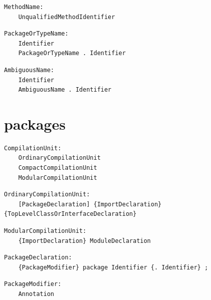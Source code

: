 \noindent\textbf{\texttt{}}\par
\begin{lstlisting}
MethodName:
    UnqualifiedMethodIdentifier
\end{lstlisting}

\noindent\textbf{\texttt{}}\par
\begin{lstlisting}
PackageOrTypeName:
    Identifier
    PackageOrTypeName . Identifier
\end{lstlisting}

\noindent\textbf{\texttt{}}\par
\begin{lstlisting}
AmbiguousName:
    Identifier
    AmbiguousName . Identifier
\end{lstlisting}

\section{packages}

\noindent\textbf{\texttt{}}\par
\begin{lstlisting}
CompilationUnit:
    OrdinaryCompilationUnit
    CompactCompilationUnit
    ModularCompilationUnit
\end{lstlisting}

\noindent\textbf{\texttt{}}\par
\begin{lstlisting}
OrdinaryCompilationUnit:
    [PackageDeclaration] {ImportDeclaration} {TopLevelClassOrInterfaceDeclaration}
\end{lstlisting}

\noindent\textbf{\texttt{}}\par
\begin{lstlisting}
ModularCompilationUnit:
    {ImportDeclaration} ModuleDeclaration
\end{lstlisting}

\noindent\textbf{\texttt{}}\par
\begin{lstlisting}
PackageDeclaration:
    {PackageModifier} package Identifier {. Identifier} ;
\end{lstlisting}

\noindent\textbf{\texttt{}}\par
\begin{lstlisting}
PackageModifier:
    Annotation
\end{lstlisting}

